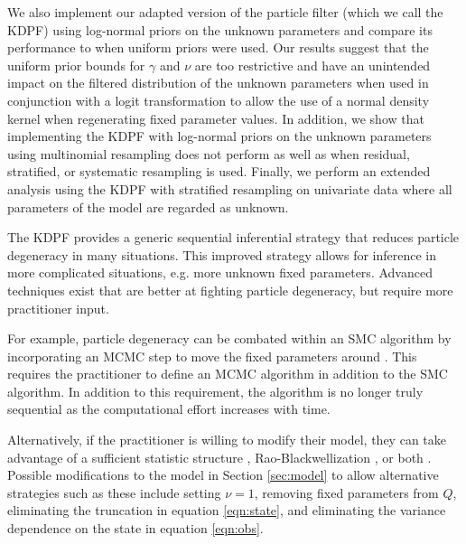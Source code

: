 We also implement our adapted version of the \citet{Liu:West:comb:2001} particle filter (which we call the KDPF) using log-normal priors on the unknown parameters and compare its performance to when uniform priors were used. Our results suggest that the uniform prior bounds for $\gamma$ and $\nu$ are too restrictive and have an unintended impact on the filtered distribution of the unknown parameters when used in conjunction with a logit transformation to allow the use of a normal density kernel when regenerating fixed parameter values. In addition, we show that implementing the KDPF with log-normal priors on the unknown parameters using multinomial resampling does not perform as well as when residual, stratified, or systematic resampling is used. Finally, we perform an extended analysis using the KDPF with stratified resampling on univariate data where all parameters of the model are regarded as unknown.

The KDPF provides a generic sequential inferential strategy that reduces particle degeneracy in many situations. This improved strategy allows for inference in more complicated situations, e.g. more unknown fixed parameters. Advanced techniques exist that are better at fighting particle degeneracy, but require more practitioner input.

For example, particle degeneracy can be combated within an SMC algorithm by incorporating an MCMC step to move the fixed parameters around \citep{Gilk:Berz:foll:2001,Stor:part:2002}. This requires the practitioner to define an MCMC algorithm in addition to the SMC algorithm. In addition to this requirement, the algorithm is no longer truly sequential as the computational effort increases with time.

Alternatively, if the practitioner is willing to modify their model, they can take advantage of a sufficient statistic structure \citep{Fear:mark:2002}, Rao-Blackwellization \citep{Douc:Gods:Andr:on:2000}, or both \citep{carvalho2010particle}. Possible modifications to the model in Section \ref{sec:model} to allow alternative strategies such as these include setting $\nu=1$, removing fixed parameters from $Q$, eliminating the truncation in equation \eqref{eqn:state}, and eliminating the variance dependence on the state in equation \eqref{eqn:obs}.


